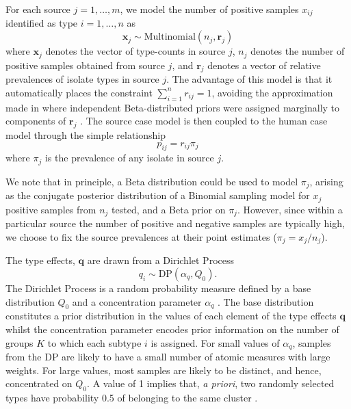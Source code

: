 For each source $j=1,\dots,m$, we model the number of positive samples $x_{ij}$ identified as type $i=1,\dots,n$ as
\begin{equation}
\bm{x}_j \sim \mbox{Multinomial}(n_j, \bm{r}_j)
\end{equation}
where $\bm{x}_j$ denotes the vector of type-counts in source $j$, $n_j$ denotes the number of positive samples obtained from source $j$, and $\bm{r}_j$ denotes a vector of relative prevalences of  
isolate types in source $j$.  The advantage of this model is that it automatically places the constraint $\sum_{i=1}^{n} r_{ij} = 1$,  avoiding the approximation made in \citet{MulJonNob09} where 
independent Beta-distributed priors were assigned marginally to components of $\bm{r}_j$ .  The source case model is then coupled to the human case model through the simple relationship 
\begin{equation}
p_{ij} = r_{ij}\pi_j
\end{equation}
where $\pi_j$ is the prevalence of any isolate in source $j$.

We note that in principle, a Beta distribution could be used to model $\pi_j$, arising as the conjugate posterior distribution of a Binomial sampling model for $x_j$ positive samples from $n_j$ tested, 
and a Beta prior on $\pi_j$.  However, since within a particular source the number of positive and negative samples are typically high, we choose to fix the source prevalences at their point estimates 
($\pi_j=x_j/n_j$). 


The type effects, $\bm{q}$ are drawn from a Dirichlet Process
\begin{equation}
q_i \sim \mbox{DP}\left( \alpha_q, Q_0 \right). \label{eq:qDP}
\end{equation}
The Dirichlet Process is a random probability measure defined by a base distribution $Q_0$ and a concentration parameter $\alpha_q$ \citep{Fer73}. The base distribution constitutes a prior 
distribution in the values of each element of the type effects $\mathbf{q}$ whilst the concentration parameter encodes prior information on the number of groups $K$ to which each subtype $i$ is 
assigned. For small values of $\alpha_q$, samples from the DP are likely to have a small number of atomic measures with large weights. For large values, most samples are likely to be distinct, and 
hence, concentrated on $Q_{0}$. A value of 1 implies that, \emph{a priori}, two randomly selected types have probability 0.5 of belonging to the same cluster \citep{GelCarSte13}.


